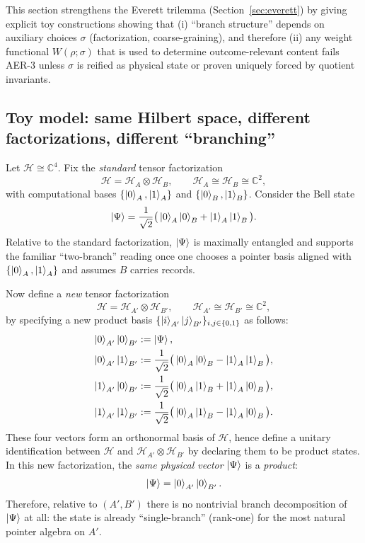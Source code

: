\documentclass[11pt]{article}
\theoremstyle{remark}
\theoremstyle{plain}
\begin{document}
This section strengthens the Everett trilemma (Section~\ref{sec:everett}) by giving explicit toy constructions
showing that (i) ``branch structure'' depends on auxiliary choices $\sigma$ (factorization, coarse-graining),
and therefore (ii) any weight functional $W(\rho;\sigma)$ that is used to determine outcome-relevant content
fails AER-3 unless $\sigma$ is reified as physical state or proven uniquely forced by quotient invariants.

\subsection{Toy model: same Hilbert space, different factorizations, different ``branching''}

Let $\mathcal{H}\cong \mathbb{C}^4$. Fix the \emph{standard} tensor factorization
\[
\mathcal{H}=\mathcal{H}_A\otimes \mathcal{H}_B,\qquad \mathcal{H}_A\cong\mathcal{H}_B\cong \mathbb{C}^2,
\]
with computational bases $\{\ket{0}_A,\ket{1}_A\}$ and $\{\ket{0}_B,\ket{1}_B\}$.
Consider the Bell state
\begin{equation}
\ket{\Psi}=\frac{1}{\sqrt{2}}\big(\ket{0}_A\ket{0}_B+\ket{1}_A\ket{1}_B\big).
\label{eq:bell}
\end{equation}
Relative to the standard factorization, $\ket{\Psi}$ is maximally entangled and supports the familiar
``two-branch'' reading once one chooses a pointer basis aligned with $\{\ket{0}_A,\ket{1}_A\}$ and assumes $B$ carries records.

Now define a \emph{new} tensor factorization
\[
\mathcal{H}=\mathcal{H}_{A'}\otimes \mathcal{H}_{B'},
\qquad \mathcal{H}_{A'}\cong\mathcal{H}_{B'}\cong\mathbb{C}^2,
\]
by specifying a new product basis $\{\ket{i}_{A'}\ket{j}_{B'}\}_{i,j\in\{0,1\}}$ as follows:
\begin{align}
\ket{0}_{A'}\ket{0}_{B'} &:= \ket{\Psi}, \nonumber\\
\ket{0}_{A'}\ket{1}_{B'} &:= \frac{1}{\sqrt{2}}\big(\ket{0}_A\ket{0}_B-\ket{1}_A\ket{1}_B\big),\nonumber\\
\ket{1}_{A'}\ket{0}_{B'} &:= \frac{1}{\sqrt{2}}\big(\ket{0}_A\ket{1}_B+\ket{1}_A\ket{0}_B\big),\nonumber\\
\ket{1}_{A'}\ket{1}_{B'} &:= \frac{1}{\sqrt{2}}\big(\ket{0}_A\ket{1}_B-\ket{1}_A\ket{0}_B\big).
\label{eq:newbasis}
\end{align}
These four vectors form an orthonormal basis of $\mathcal{H}$, hence define a unitary identification
between $\mathcal{H}$ and $\mathcal{H}_{A'}\otimes\mathcal{H}_{B'}$ by declaring them to be product states.
In this new factorization, the \emph{same physical vector} $\ket{\Psi}$ is a \emph{product}:
\[
\ket{\Psi}=\ket{0}_{A'}\ket{0}_{B'}.
\]
Therefore, relative to $(A',B')$ there is no nontrivial branch decomposition of $\ket{\Psi}$ at all:
the state is already ``single-branch'' (rank-one) for the most natural pointer algebra on $A'$.
\end{document}
